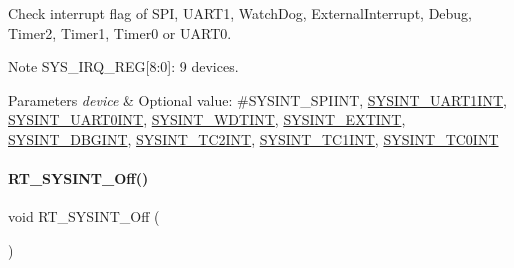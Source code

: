 Check interrupt flag of S\+PI, U\+A\+R\+T1, Watch\+Dog, External\+Interrupt, Debug, Timer2, Timer1, Timer0 or U\+A\+R\+T0. 

\begin{DoxyNote}{Note}
S\+Y\+S\+\_\+\+I\+R\+Q\+\_\+\+R\+EG\mbox{[}8\+:0\mbox{]}\+: 9 devices. 
\end{DoxyNote}

\begin{DoxyParams}{Parameters}
{\em device} & Optional value\+: \#\+S\+Y\+S\+I\+N\+T\+\_\+\+S\+P\+I\+I\+NT, \mbox{\hyperlink{a00011_afa38f6b3d96898de1e521bf88e097a4ca0363b01262967c7900f56bf11fb3541d}{S\+Y\+S\+I\+N\+T\+\_\+\+U\+A\+R\+T1\+I\+NT}}, \mbox{\hyperlink{a00011_afa38f6b3d96898de1e521bf88e097a4ca3fce9e90d8963a30d0fdb51cd9009db9}{S\+Y\+S\+I\+N\+T\+\_\+\+U\+A\+R\+T0\+I\+NT}}, \mbox{\hyperlink{a00011_afa38f6b3d96898de1e521bf88e097a4caa245202adffe4900175deab41b6518fc}{S\+Y\+S\+I\+N\+T\+\_\+\+W\+D\+T\+I\+NT}}, \mbox{\hyperlink{a00011_afa38f6b3d96898de1e521bf88e097a4caf7b71238d06781c61f2d4894f74b12c3}{S\+Y\+S\+I\+N\+T\+\_\+\+E\+X\+T\+I\+NT}}, \mbox{\hyperlink{a00011_afa38f6b3d96898de1e521bf88e097a4ca108e51031e1626a71e03626005ee11c2}{S\+Y\+S\+I\+N\+T\+\_\+\+D\+B\+G\+I\+NT}}, \mbox{\hyperlink{a00011_afa38f6b3d96898de1e521bf88e097a4cace28a954633dd9ea0cdef0ad00fe87a2}{S\+Y\+S\+I\+N\+T\+\_\+\+T\+C2\+I\+NT}}, \mbox{\hyperlink{a00011_afa38f6b3d96898de1e521bf88e097a4ca6a6e9a3e70344b1de433dcde4bfa569d}{S\+Y\+S\+I\+N\+T\+\_\+\+T\+C1\+I\+NT}}, \mbox{\hyperlink{a00011_afa38f6b3d96898de1e521bf88e097a4ca046fae26abf2ef23f7ea24607cd837f5}{S\+Y\+S\+I\+N\+T\+\_\+\+T\+C0\+I\+NT}} \\
\hline
\end{DoxyParams}
\mbox{\label{a00011_acf51664514fdf6f702d8209e95e445dc}} 
\paragraph{\texorpdfstring{R\+T\+\_\+\+S\+Y\+S\+I\+N\+T\+\_\+\+Off()}{RT\_SYSINT\_Off()}}
{\footnotesize\ttfamily void R\+T\+\_\+\+S\+Y\+S\+I\+N\+T\+\_\+\+Off (\begin{DoxyParamCaption}{ }\end{DoxyParamCaption})\hspace{0.3cm}{\ttfamily [inline]}}



